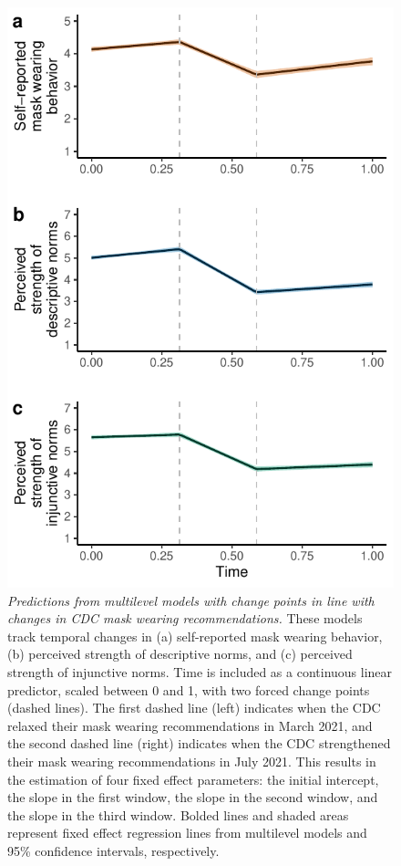 \documentclass[
  english,
  man,floatsintext]{apa6}
\begin{document}
\begin{figure}
\centering
\includegraphics{manuscript_files/figure-latex/plotCDCSens-1.pdf}
\caption{\label{fig:plotCDCSens}\emph{Predictions from multilevel models with change points in line with changes in CDC mask wearing recommendations.} These models track temporal changes in (a) self-reported mask wearing behavior, (b) perceived strength of descriptive norms, and (c) perceived strength of injunctive norms. Time is included as a continuous linear predictor, scaled between 0 and 1, with two forced change points (dashed lines). The first dashed line (left) indicates when the CDC relaxed their mask wearing recommendations in March 2021, and the second dashed line (right) indicates when the CDC strengthened their mask wearing recommendations in July 2021. This results in the estimation of four fixed effect parameters: the initial intercept, the slope in the first window, the slope in the second window, and the slope in the third window. Bolded lines and shaded areas represent fixed effect regression lines from multilevel models and 95\% confidence intervals, respectively.}
\end{figure}
\end{document}
